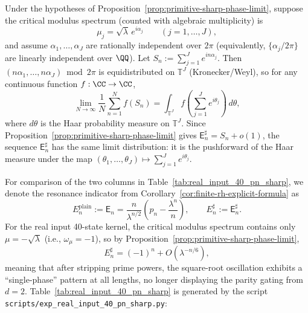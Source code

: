 \begin{remark}\label{rem:primitive-sharp-limit-law}
Under the hypotheses of Proposition~\ref{prop:primitive-sharp-phase-limit}, suppose the critical modulus spectrum (counted with algebraic multiplicity) is
\[
\mu_j=\sqrt{\lambda}\,e^{i\alpha_j}\qquad(j=1,\dots,J),
\]
and assume \(\alpha_1,\dots,\alpha_J\) are rationally independent over \(2\pi\) (equivalently, \(\{\alpha_j/2\pi\}\) are linearly independent over \(\QQ\)).
Let
\(
S_n:=\sum_{j=1}^{J}e^{in\alpha_j}
\).
Then \((n\alpha_1,\dots,n\alpha_J)\bmod 2\pi\) is equidistributed on \(\mathbb{T}^J\) (Kronecker/Weyl), so for any continuous function \(f:\CC\to\CC\),
\[
\lim_{N\to\infty}\frac{1}{N}\sum_{n=1}^{N} f(S_n)
=\int_{\mathbb{T}^J} f\!\left(\sum_{j=1}^{J}e^{i\theta_j}\right)\,d\theta,
\]
where \(d\theta\) is the Haar probability measure on \(\mathbb{T}^J\).
Since Proposition~\ref{prop:primitive-sharp-phase-limit} gives \(\mathsf{E}_n^\sharp=S_n+o(1)\), the sequence \(\mathsf{E}_n^\sharp\) has the same limit distribution: it is the pushforward of the Haar measure under the map \((\theta_1,\dots,\theta_J)\mapsto\sum_{j=1}^{J}e^{i\theta_j}\).
\end{remark}

\begin{remark}\label{rem:real-input-40-pn-sharp}
For comparison of the two columns in Table~\ref{tab:real_input_40_pn_sharp}, we denote the resonance indicator from Corollary~\ref{cor:finite-rh-explicit-formula} as
\[
E_n^{\mathrm{plain}}
:=\mathsf{E}_n
=\frac{n}{\lambda^{n/2}}\left(p_n-\frac{\lambda^n}{n}\right),
\qquad
E_n^{\sharp}:=\mathsf{E}_n^\sharp.
\]
For the real input 40-state kernel, the critical modulus spectrum contains only \(\mu=-\sqrt{\lambda}\) (i.e., \(\omega_\mu=-1\)), so by Proposition~\ref{prop:primitive-sharp-phase-limit},
\[
E_n^{\sharp}=(-1)^n+O(\lambda^{-n/6}),
\]
meaning that after stripping prime powers, the square-root oscillation exhibits a ``single-phase'' pattern at all lengths, no longer displaying the parity gating from \(d=2\).
Table~\ref{tab:real_input_40_pn_sharp} is generated by the script \texttt{scripts/exp\_real\_input\_40\_pn\_sharp.py}:

\end{remark}

